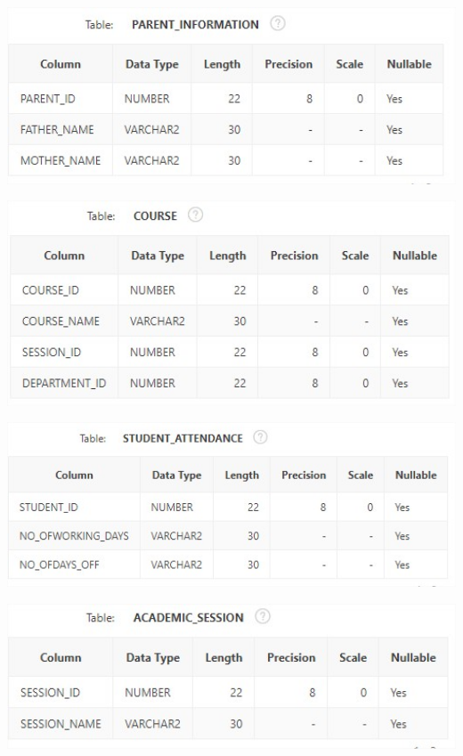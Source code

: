 \documentclass[12pt,letterpaper]{article}
\begin{document}
		
\begin{center}
\includegraphics[width=15cm]{./llatasiImagen/tabla3}
\end{center}		


\begin{center}
\includegraphics[width=15cm]{./llatasiImagen/tabla4}
\end{center}		
		
		
\begin{center}
\includegraphics[width=15cm]{./llatasiImagen/tabla5}
\end{center}		
		
		
\begin{center}
\includegraphics[width=15cm]{./llatasiImagen/tabla6}
\end{center}		
		
\end{document}
